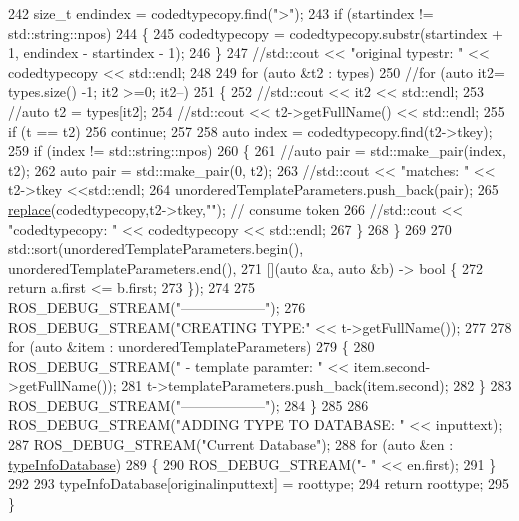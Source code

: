 \begin{DoxyCode}
242         \textcolor{keywordtype}{size\_t} endindex = codedtypecopy.find(\textcolor{stringliteral}{">"});
243         \textcolor{keywordflow}{if} (startindex != std::string::npos)
244         \{
245             codedtypecopy = codedtypecopy.substr(startindex + 1, endindex - startindex - 1);
246         \}
247         \textcolor{comment}{//std::cout << "original typestr: " << codedtypecopy << std::endl;}
248 
249         \textcolor{keywordflow}{for} (\textcolor{keyword}{auto} &t2 : types)
250         \textcolor{comment}{//for (auto it2= types.size() -1; it2 >=0; it2--)}
251         \{
252             \textcolor{comment}{//std::cout << it2 << std::endl;}
253             \textcolor{comment}{//auto t2 = types[it2];}
254             \textcolor{comment}{//std::cout << t2->getFullName() << std::endl;}
255             \textcolor{keywordflow}{if} (t == t2)
256                 \textcolor{keywordflow}{continue};
257 
258             \textcolor{keyword}{auto} index = codedtypecopy.find(t2->tkey);
259             \textcolor{keywordflow}{if} (index != std::string::npos)
260             \{
261                 \textcolor{comment}{//auto pair = std::make\_pair(index, t2);}
262                 \textcolor{keyword}{auto} pair = std::make\_pair(0, t2);
263                 \textcolor{comment}{//std::cout << "matches: " << t2->tkey <<std::endl;}
264                 unorderedTemplateParameters.push\_back(pair);
265                 \hyperlink{namespacesmacc_1_1introspection_a48571b9bf3b115d2a83cc0147c96d0bd}{replace}(codedtypecopy,t2->tkey,\textcolor{stringliteral}{""}); \textcolor{comment}{// consume token}
266                 \textcolor{comment}{//std::cout << "codedtypecopy: " << codedtypecopy << std::endl;}
267             \}
268         \}
269 
270         std::sort(unorderedTemplateParameters.begin(), unorderedTemplateParameters.end(),
271                   [](\textcolor{keyword}{auto} &a, \textcolor{keyword}{auto} &b) -> \textcolor{keywordtype}{bool} \{
272                       \textcolor{keywordflow}{return} a.first <= b.first;
273                   \});
274 
275         ROS\_DEBUG\_STREAM(\textcolor{stringliteral}{"------------------"});
276         ROS\_DEBUG\_STREAM(\textcolor{stringliteral}{"CREATING TYPE:"} << t->getFullName());
277 
278         \textcolor{keywordflow}{for} (\textcolor{keyword}{auto} &item : unorderedTemplateParameters)
279         \{
280             ROS\_DEBUG\_STREAM(\textcolor{stringliteral}{" - template paramter: "} << item.second->getFullName());
281             t->templateParameters.push\_back(item.second);
282         \}
283         ROS\_DEBUG\_STREAM(\textcolor{stringliteral}{"------------------"});
284     \}
285 
286     ROS\_DEBUG\_STREAM(\textcolor{stringliteral}{"ADDING TYPE TO DATABASE: "} << inputtext);
287     ROS\_DEBUG\_STREAM(\textcolor{stringliteral}{"Current Database"});
288     \textcolor{keywordflow}{for} (\textcolor{keyword}{auto} &en : \hyperlink{classsmacc_1_1introspection_1_1TypeInfo_ab780c03206b824aaf338135d16b0eff4}{typeInfoDatabase})
289     \{
290         ROS\_DEBUG\_STREAM(\textcolor{stringliteral}{"- "} << en.first);
291     \}
292 
293     typeInfoDatabase[originalinputtext] = roottype;
294     \textcolor{keywordflow}{return} roottype;
295 \}
\end{DoxyCode}



